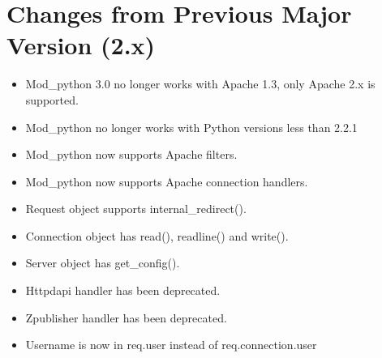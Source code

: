 \chapter{Changes from Previous Major Version (2.x)\label{app-changes}}


\begin{itemize}

\item
Mod_python 3.0 no longer works with Apache 1.3, only Apache 2.x is
supported.
\item
Mod_python no longer works with Python versions less than 2.2.1
\item 
Mod_python now supports Apache filters.
\item 
Mod_python now supports Apache connection handlers.
\item 
Request object supports internal_redirect().
\item
Connection object has read(), readline() and write().
\item
Server object has get_config().
\item
{} 
Httpdapi handler has been deprecated.
\item
{}
Zpublisher handler has been deprecated.
\item
Username is now in req.user instead of req.connection.user

\end{itemize}
